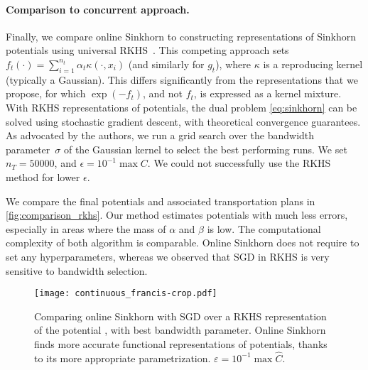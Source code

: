 \paragraph{Comparison to concurrent approach.}\label{sec:compare}Finally, we compare online
Sinkhorn to constructing representations of Sinkhorn potentials using universal
RKHS~\cite{2016-genevay-nips}. This competing approach sets $f_t(\cdot) =
\sum_{i=1}^{n_t} \alpha_t \kappa(\cdot, x_i)$ (and similarly for $g_t$), where $\kappa$ is
a reproducing kernel (typically a Gaussian). This differs significantly from the
representations that we propose, for which $\exp(-f_t)$, and not $f_t$, is
expressed as a kernel mixture. 
%
With RKHS representations of potentials, the
dual problem \eqref{eq:sinkhorn} can be solved using stochastic gradient
descent, with theoretical convergence guarantees. As advocated by the authors,
we run a grid search over the bandwidth parameter~$\sigma$ of the Gaussian kernel to select the best
performing runs. We set $n_T = 50000$, and $\epsilon = 10^{-1} \max C$. We could not successfully use the RKHS method for lower $\epsilon$.

We compare the final potentials and associated transportation plans in
\autoref{fig:comparison_rkhs}. Our method estimates potentials with much less
errors, especially in areas where the mass of $\alpha$ and $\beta$ is low. The
computational complexity of both algorithm is comparable. Online Sinkhorn does
not require to set any hyperparameters, whereas we observed that SGD in RKHS is very
sensitive to bandwidth selection.

\begin{figure}[t]
    \centering
    \texttt{[image: continuous\_francis-crop.pdf]}
    \caption{Comparing online Sinkhorn with SGD over a RKHS representation of the potential \citep{2016-genevay-nips}, with best bandwidth parameter. Online Sinkhorn finds more accurate functional representations of potentials, thanks to its more appropriate parametrization. $\varepsilon = 10^{-1} \max \hat C$.}
    \label{fig:comparison_rkhs}
\end{figure}